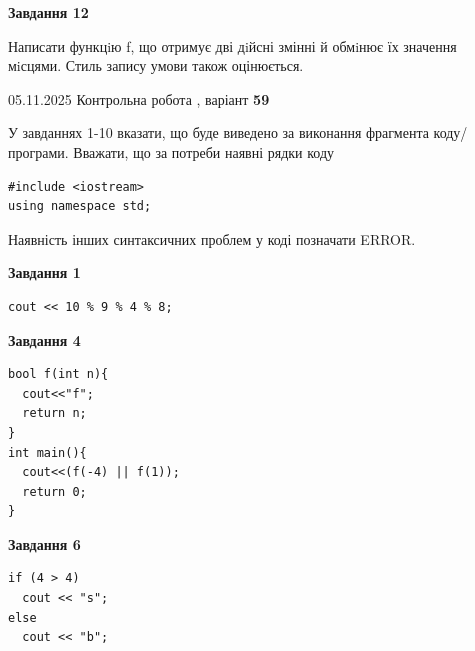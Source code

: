 \documentclass[12pt, ukrainian]{article}
\begin{document}
{\begin {large}
\begin{minipage}[t]{11.0cm}
\begin{center}
\textbf{Завдання 12}
\end{center}

Написати функцiю f, що отримує дві дiйсні змінні й обмiнює їх значення мiсцями. Стиль запису умови також оцінюється.\par

\end{minipage}

\end {large}}
\newpage

{\Large{05.11.2025 Контрольна робота , варіант  \No \textbf { 59 }\par}}
{
\begin {large}
У завданнях 1-10 вказати, що буде виведено за виконання фрагмента коду/про\-гра\-ми.
Вважати, що за потреби наявні рядки коду
\begin{verbatim}
#include <iostream>
using namespace std;
\end{verbatim}
Наявність інших синтаксичних проблем у коді позначати ERROR.

\begin{minipage}[t]{7.0cm}

\begin{center}
\textbf{Завдання 1}
\end{center}
\vspace{-8mm}

\begin{verbatim}
cout << 10 % 9 % 4 % 8;
\end{verbatim}



\begin{center}
\textbf{Завдання 4}
\end{center}
\vspace{-8mm}

\begin{verbatim}
bool f(int n){
  cout<<"f";
  return n;
}
int main(){
  cout<<(f(-4) || f(1));
  return 0;
}
\end{verbatim}



\begin{center}
\textbf{Завдання 6}
\end{center}
\vspace{-8mm}

\begin{verbatim}
if (4 > 4)
  cout << "s";
else
  cout << "b";
\end{verbatim}




\end{minipage}
\end{large}}
\end{document}
